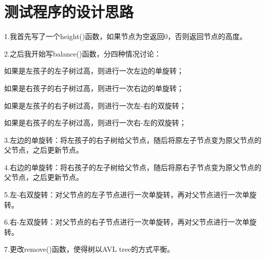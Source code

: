 \documentclass[UTF8]{ctexart}
\begin{document}
	
	\pagestyle{fancy}
	\fancyhead{}
	
	\section{测试程序的设计思路}
	1.我首先写了一个height()函数，如果节点为空返回0，否则返回节点的高度。
	
	2.之后我开始写balance()函数，分四种情况讨论：
	
	如果是左孩子的左子树过高，则进行一次左边的单旋转；
	
	如果是右孩子的右子树过高，则进行一次右边的单旋转；
	
	如果是左孩子的右子树过高，则进行一次左-右的双旋转；
	
	如果是右孩子的左子树过高，则进行一次右-左的双旋转；
	
	3.左边的单旋转：将左孩子的右子树给父节点，随后将原左子节点变为原父节点的父节点，之后更新节点。
	
	4.右边的单旋转：将右孩子的左子树给父节点，随后将原右子节点变为原父节点的父节点，之后更新节点。
	
	5.左-右双旋转：对父节点的左子节点进行一次单旋转，再对父节点进行一次单旋转。
	
	6.右-左双旋转：对父节点的右子节点进行一次单旋转，再对父节点进行一次单旋转。

	7.更改remove()函数，使得树以AVL tree的方式平衡。
	
\end{document}
